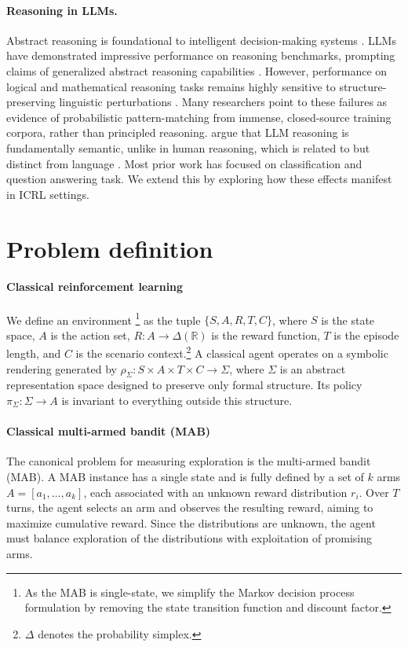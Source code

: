 \documentclass{article} %
\begin{document}
\paragraph{Reasoning in LLMs.}
Abstract reasoning is foundational to intelligent decision-making systems \citep{chollet2019measureintelligence, herbsimon}. LLMs have demonstrated impressive performance on reasoning benchmarks, prompting claims of generalized abstract reasoning capabilities \citep{bubeck2023sparks, weiemergent}. However, performance on logical and mathematical reasoning tasks remains highly sensitive to structure-preserving linguistic perturbations \citep{Shi2023LargeLM, jiang-etal-2024-peek, mirzadeh2025gsmsymbolic, tang2023large, cheng2025can}. Many researchers \citep{kambhampatiPositionLLMsCant2024, jiang-etal-2024-peek, mirzadeh2025gsmsymbolic, zhang2023paradox} point to these failures as evidence of probabilistic pattern-matching from immense, closed-source training corpora, rather than principled reasoning. \citet{tang2023large} argue that LLM reasoning is fundamentally semantic, unlike in human reasoning, which is related to but distinct from language \citep{mahowaldDissociatingLanguageThought2024a}. Most prior work has focused on classification and question answering task. We extend this by exploring how these effects manifest in ICRL settings.

\section{Problem definition}
\paragraph{Classical reinforcement learning} 
We define an environment \footnote{As the MAB is single-state, we simplify the Markov decision process formulation by removing the state transition function and discount factor.} as the tuple $\{S, A, R, T, C\}$, where $S$ is the state space, $A$ is the action set, $R : A \rightarrow \Delta(\mathbb{R})$ is the reward function, $T$ is the episode length, and $C$ is the scenario context.\footnote{$\Delta$ denotes the probability simplex.} A classical agent operates on a symbolic rendering generated by $\rho_{\Sigma} : S \times A \times T \times C \rightarrow \Sigma$, where $\Sigma$ is an abstract representation space designed to preserve only formal structure. Its policy $\pi_{\Sigma} : \Sigma \rightarrow A$ is invariant to everything outside this structure.

\paragraph{Classical multi-armed bandit (MAB)}
The canonical problem for measuring exploration is the multi-armed bandit (MAB). A MAB instance has a single state and is fully defined by a set of $k$ arms $A = [a_1, \ldots, a_k]$, each associated with an unknown reward distribution $r_i$.  Over $T$ turns, the agent selects an arm and observes the resulting reward, aiming to maximize cumulative reward. Since the distributions are unknown, the agent must balance exploration of the distributions with exploitation of promising arms.
\end{document}
